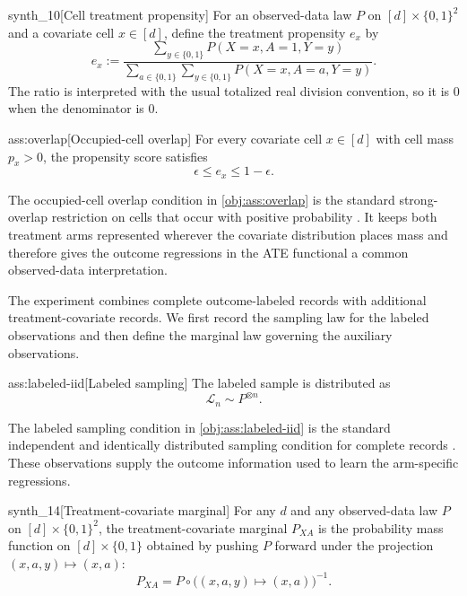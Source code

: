 \begin{definitionv}{synth_10}[Cell treatment propensity]
For an observed-data law \(P\) on \([d]\times\{0,1\}^2\) and a covariate cell \(x\in[d]\), define the treatment propensity \(e_x\) by
\[
e_x
:=
\frac{\sum_{y\in\{0,1\}} P(X=x,A=1,Y=y)}
{\sum_{a\in\{0,1\}}\sum_{y\in\{0,1\}} P(X=x,A=a,Y=y)}.
\]
The ratio is interpreted with the usual totalized real division convention, so it is \(0\) when the denominator is \(0\).
\end{definitionv}

\begin{assumptionv}{ass:overlap}[Occupied-cell overlap]
For every covariate cell \(x\in[d]\) with cell mass \(p_x>0\), the propensity score satisfies
\[
\epsilon \le e_x \le 1-\epsilon .
\]
\end{assumptionv}

The occupied-cell overlap condition in \cref{obj:ass:overlap} is the standard strong-overlap restriction on cells that occur with positive probability \citep{ZengBalakrishnanHanKennedy2024}. It keeps both treatment arms represented wherever the covariate distribution places mass and therefore gives the outcome regressions in the ATE functional a common observed-data interpretation.

The experiment combines complete outcome-labeled records with additional treatment-covariate records. We first record the sampling law for the labeled observations and then define the marginal law governing the auxiliary observations.

\begin{assumptionv}{ass:labeled-iid}[Labeled sampling]
The labeled sample is distributed as
\[
\mathcal L_n \sim P^{\otimes n}.
\]
\end{assumptionv}

The labeled sampling condition in \cref{obj:ass:labeled-iid} is the standard independent and identically distributed sampling condition for complete records \citep{ZengBalakrishnanHanKennedy2024}. These observations supply the outcome information used to learn the arm-specific regressions.

\begin{definitionv}{synth_14}[Treatment-covariate marginal]
For any \(d\) and any observed-data law \(P\) on \([d]\times\{0,1\}^2\), the treatment-covariate marginal \(P_{XA}\) is the probability mass function on \([d]\times\{0,1\}\) obtained by pushing \(P\) forward under the projection \((x,a,y)\mapsto (x,a)\):
\[
P_{XA}
=
P\circ\bigl((x,a,y)\mapsto (x,a)\bigr)^{-1}.
\]
\end{definitionv}

